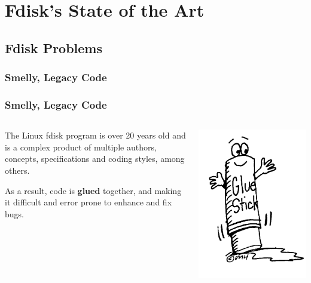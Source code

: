 
\section{Fdisk's State of the Art}
\subsection{Fdisk Problems}
\subsubsection{Smelly, Legacy Code}

\begin{frame}\frametitle{Smelly, Legacy Code}
  \begin{columns}
    \begin{column}{.5\linewidth}
      The Linux fdisk program is over 20 years old and is a complex product of multiple authors, concepts, specifications and coding styles, among others.\newline

      As a result, code is \textbf{glued} together, and making it difficult and error prone to enhance and fix bugs.
    \end{column}
    \begin{column}{.5\linewidth}
      \includegraphics[scale=0.2]{img/glustick}
    \end{column}
  \end{columns}
\end{frame}

